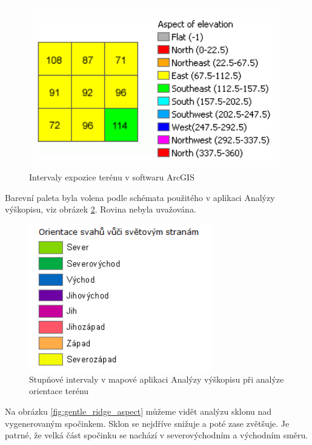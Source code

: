 \documentclass[a4paper,11pt,twoside]{article}
\begin{document}
\vspace{0.2cm}
\begin{figure}[hbt!] 
\begin{center}
\includegraphics[width=11cm]{pictures/aspect.PNG} 
\caption[Intervaly expozice terénu v softwaru ArcGIS]{Intervaly expozice terénu v softwaru ArcGIS \cite{aspect}}
\label{fig:aspect}
\end{center}
\end{figure}

Barevní paleta byla volena podle schémata použitého v aplikaci Analýzy výškopisu, viz obrázek \ref{fig:analyzy_aspect}. Rovina nebyla uvažována.

\vspace{0.2cm}
\begin{figure}[hbt!] 
\begin{center}
\includegraphics[width=8cm]{pictures/analyzy_aspect.PNG} 
\caption[Stupňové intervaly v mapové aplikaci Analýzy výškopisu při analýze orientace terénu ]{Stupňové intervaly v mapové aplikaci Analýzy výškopisu při analýze orientace terénu}
\label{fig:analyzy_aspect}
\end{center}
\end{figure}

Na obrázku \ref{fig:gentle_ridge_aspect} můžeme vidět analýzu sklonu nad vygenerovaným spočinkem. Sklon se nejdříve snižuje a poté zase zvětšuje. Je patrné, že velká část spočinku se nachází v severovýchodním a východním směru.
\end{document}
